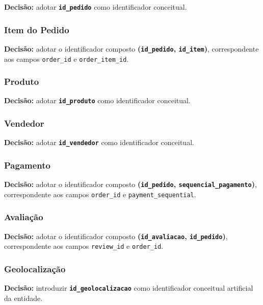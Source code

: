 \documentclass[12pt,a4paper]{article}
\begin{document}
	\noindent
	\textbf{Decisão:}
	adotar \textbf{\texttt{id\_pedido}} como identificador conceitual.
	
	\subsubsection{Item do Pedido}
	
	\noindent
	\textbf{Decisão:}
	adotar o identificador composto
	\textbf{(\texttt{id\_pedido}, \texttt{id\_item})},
	correspondente aos campos \texttt{order\_id} e
	\texttt{order\_item\_id}.
	
	\subsubsection{Produto}
	
	\noindent
	\textbf{Decisão:}
	adotar \textbf{\texttt{id\_produto}} como identificador conceitual.
	
	\subsubsection{Vendedor}
	
	\noindent
	\textbf{Decisão:}
	adotar \textbf{\texttt{id\_vendedor}} como identificador conceitual.
	
	\subsubsection{Pagamento}
	
	\noindent
	\textbf{Decisão:}
	adotar o identificador composto
	\textbf{(\texttt{id\_pedido}, \texttt{sequencial\_pagamento})},
	correspondente aos campos \texttt{order\_id} e
	\texttt{payment\_sequential}.
	
	\subsubsection{Avaliação}
	
	\noindent
	\textbf{Decisão:}
	adotar o identificador composto
	\textbf{(\texttt{id\_avaliacao}, \texttt{id\_pedido})},
	correspondente aos campos \texttt{review\_id} e \texttt{order\_id}.
	
	\subsubsection{Geolocalização}
	
	\noindent
	\textbf{Decisão:}
	introduzir \textbf{\texttt{id\_geolocalizacao}} como identificador conceitual
	artificial da entidade.
	
\end{document}
